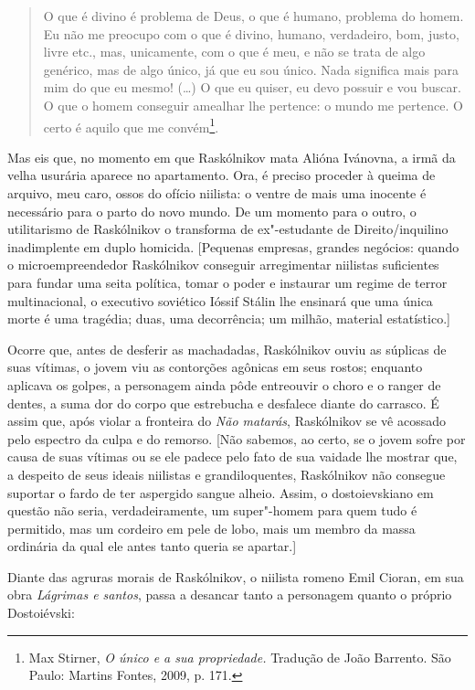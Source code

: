 \begin{quote}
O que é divino é problema de Deus, o que é humano, problema do homem. Eu
não me preocupo com o que é divino, humano, verdadeiro, bom, justo,
livre etc., mas, unicamente, com o que é meu, e não se trata de algo
genérico, mas de algo único, já que eu sou único. Nada significa mais
para mim do que eu mesmo! (\ldots{}) O que eu quiser, eu devo possuir e vou
buscar. O que o homem conseguir amealhar lhe pertence: o mundo me
pertence. O certo é aquilo que me convém\footnote{Max Stirner, \emph{O
  único e a sua propriedade.} Tradução de João Barrento. São Paulo:
  Martins Fontes, 2009, p. 171.}.
\end{quote}

Mas eis que, no momento em que Raskólnikov mata Alióna Ivánovna, a irmã
da velha usurária aparece no apartamento. Ora, é preciso proceder à
queima de arquivo, meu caro, ossos do ofício niilista: o ventre de mais
uma inocente é necessário para o parto do novo mundo. De um momento para
o outro, o utilitarismo de Raskólnikov o transforma de ex"-estudante de
Direito/inquilino inadimplente em duplo homicida. {[}Pequenas empresas,
grandes negócios: quando o microempreendedor Raskólnikov conseguir
arregimentar niilistas suficientes para fundar uma seita política, tomar
o poder e instaurar um regime de terror multinacional, o executivo
soviético Ióssif Stálin lhe ensinará que uma única morte é uma tragédia;
duas, uma decorrência; um milhão, material estatístico.{]}

Ocorre que, antes de desferir as machadadas, Raskólnikov ouviu as
súplicas de suas vítimas, o jovem viu as contorções agônicas em seus
rostos; enquanto aplicava os golpes, a personagem ainda pôde entreouvir
o choro e o ranger de dentes, a suma dor do corpo que estrebucha e
desfalece diante do carrasco. É assim que, após violar a fronteira do
\emph{Não matarás}, Raskólnikov se vê acossado pelo espectro da culpa e
do remorso. {[}Não sabemos, ao certo, se o jovem sofre por causa de suas
vítimas ou se ele padece pelo fato de sua vaidade lhe mostrar que, a
despeito de seus ideais niilistas e grandiloquentes, Raskólnikov não
consegue suportar o fardo de ter aspergido sangue alheio. Assim, o
dostoievskiano em questão não seria, verdadeiramente, um super"-homem
para quem tudo é permitido, mas um cordeiro em pele de lobo, mais um
membro da massa ordinária da qual ele antes tanto queria se apartar.{]}

Diante das agruras morais de Raskólnikov, o niilista romeno Emil Cioran,
em sua obra \emph{Lágrimas e santos}, passa a desancar tanto a
personagem quanto o próprio Dostoiévski:

